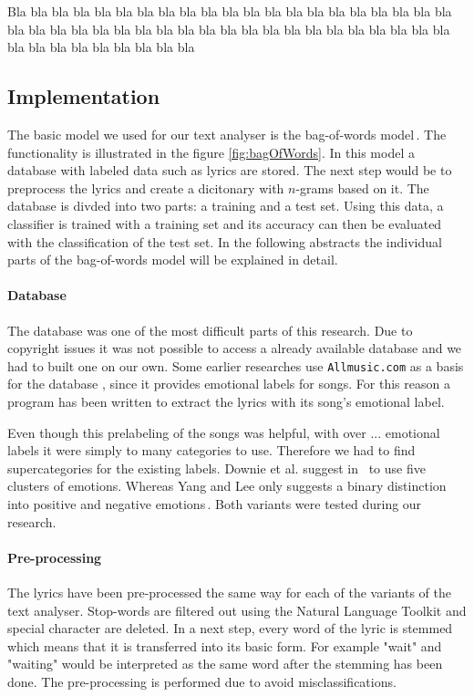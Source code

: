 \documentclass[a4paper,12pt]{article}
\begin{document}
Bla bla bla bla bla bla bla bla bla bla bla bla bla bla bla bla bla 
bla bla bla bla bla bla bla bla bla bla bla bla bla bla bla bla bla 
bla bla bla bla bla bla bla bla bla bla bla bla bla bla bla bla bla 

\subsection{Implementation}
\label{sec:impl}

The basic model we used for our text analyser is the bag-of-words model\,\cite{Mitchell}. The functionality is illustrated in the figure \ref{fig:bagOfWords}. In this model a database with labeled data such as lyrics are stored. The next step would be to preprocess the lyrics and create a dicitonary with $n$-grams based on it. The database is divded into two parts: a training and a test set. Using this data, a classifier is trained with a training set and its accuracy can then be evaluated with the classification of the test set. In the following abstracts the individual parts of the bag-of-words model will be explained in detail. 

\paragraph{Database} The database was one of the most difficult parts of this research. Due to copyright issues it was not possible to access a already available database and we had to built one on our own. Some earlier researches use \texttt{Allmusic.com} as a basis for the database \cite{kim2010music}, since it provides emotional labels for songs. For this reason a program has been written to extract the lyrics with its song's emotional label. 

Even though this prelabeling of the songs was helpful, with over ... emotional labels it were simply to many categories to use. Therefore we had to find supercategories for the existing labels. Downie et al. suggest in \,\cite{downie20082007}  to use five clusters of emotions. Whereas Yang and Lee only suggests a binary distinction into positive and negative emotions\,\cite{yang2009music}. Both variants were tested during our research.

\paragraph{Pre-processing} The lyrics have been pre-processed the same way for each of the variants of the text analyser. Stop-words are filtered out using the Natural Language Toolkit and special character are deleted. In a next step, every word of the lyric is stemmed which means that it is transferred into its basic form. For example "wait" and "waiting" would be interpreted as the same word after the stemming has been done. The pre-processing is performed due to avoid misclassifications. 
\end{document}
